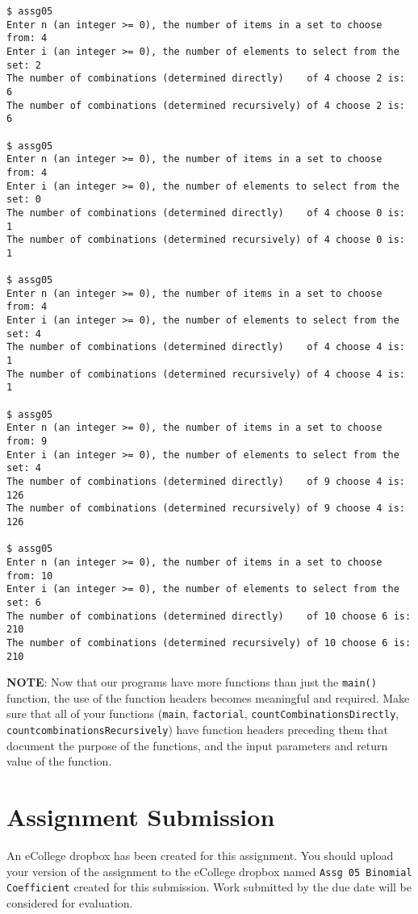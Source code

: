 \documentclass[11pt]{article}
\begin{document}
\begin{verbatim}
$ assg05 
Enter n (an integer >= 0), the number of items in a set to choose from: 4
Enter i (an integer >= 0), the number of elements to select from the set: 2
The number of combinations (determined directly)    of 4 choose 2 is: 6
The number of combinations (determined recursively) of 4 choose 2 is: 6

$ assg05 
Enter n (an integer >= 0), the number of items in a set to choose from: 4
Enter i (an integer >= 0), the number of elements to select from the set: 0
The number of combinations (determined directly)    of 4 choose 0 is: 1
The number of combinations (determined recursively) of 4 choose 0 is: 1

$ assg05 
Enter n (an integer >= 0), the number of items in a set to choose from: 4
Enter i (an integer >= 0), the number of elements to select from the set: 4
The number of combinations (determined directly)    of 4 choose 4 is: 1
The number of combinations (determined recursively) of 4 choose 4 is: 1

$ assg05 
Enter n (an integer >= 0), the number of items in a set to choose from: 9
Enter i (an integer >= 0), the number of elements to select from the set: 4
The number of combinations (determined directly)    of 9 choose 4 is: 126
The number of combinations (determined recursively) of 9 choose 4 is: 126

$ assg05 
Enter n (an integer >= 0), the number of items in a set to choose from: 10
Enter i (an integer >= 0), the number of elements to select from the set: 6
The number of combinations (determined directly)    of 10 choose 6 is: 210
The number of combinations (determined recursively) of 10 choose 6 is: 210
\end{verbatim}


\textbf{NOTE}: Now that our programs have more functions than just the
\verb~main()~ function, the use of the function headers becomes meaningful
and required.  Make sure that all of your functions (\verb~main~,
\verb~factorial~, \verb~countCombinationsDirectly~,
\verb~countcombinationsRecursively~) have function headers preceding them
that document the purpose of the functions, and the input parameters
and return value of the function.
\section*{Assignment Submission}
\label{sec-4}

An eCollege dropbox has been created for this assignment.  You should
upload your version of the assignment to the eCollege dropbox named
\verb~Assg 05 Binomial Coefficient~ created for this submission.  Work
submitted by the due date will be considered for evaluation.
\end{document}
